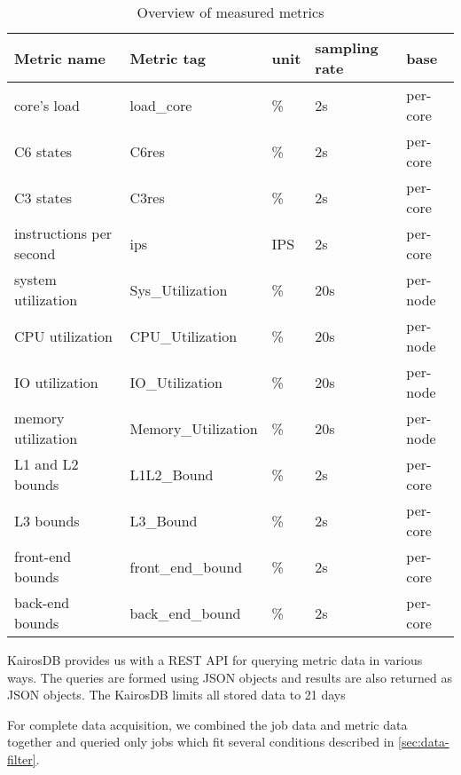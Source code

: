 \begin{table}[ht!]
\centering
\begin{tabular}{lllll}
Metric name             & Metric tag          & unit & sampling rate & base \\ \hline
core's load             & load\_core          & \%  & 2s  & per-core \\ \hline
C6 states               & C6res               & \%  & 2s  & per-core \\ \hline
C3 states               & C3res               & \%  & 2s  & per-core \\ \hline
instructions per second & ips                 & IPS & 2s  & per-core \\ \hline
system utilization      & Sys\_Utilization    & \%  & 20s & per-node \\ \hline
CPU utilization         & CPU\_Utilization    & \%  & 20s & per-node \\ \hline
IO utilization          & IO\_Utilization     & \%  & 20s & per-node \\ \hline
memory utilization      & Memory\_Utilization & \%  & 20s & per-node \\ \hline
L1 and L2 bounds        & L1L2\_Bound         & \%  & 2s  & per-core \\ \hline
L3 bounds               & L3\_Bound           & \%  & 2s  & per-core \\ \hline
front-end bounds        & front\_end\_bound   & \%  & 2s  & per-core \\ \hline
back-end bounds         & back\_end\_bound    & \%  & 2s  & per-core \\ \hline
\end{tabular}
\caption{Overview of measured metrics}
\label{tab:metrics}
\end{table}

KairosDB provides us with a REST API for querying metric data in various ways. The queries are formed using JSON objects and results are also returned as JSON objects. The KairosDB limits all stored data to 21 days

For complete data acquisition, we combined the job data and metric data together and queried only jobs which fit several conditions described in \ref{sec:data-filter}.
